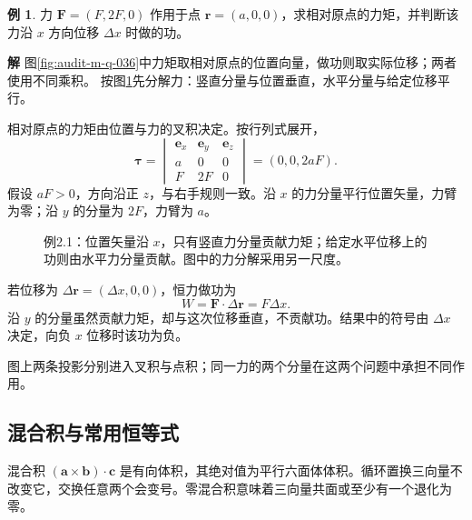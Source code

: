 \documentclass[11pt,openany,fontset=fandol]{ctexbook}
\theoremstyle{plain}\newtheorem{theorem}{定理}[chapter]\newtheorem{proposition}[theorem]{命题}
\theoremstyle{definition}\newtheorem{definition}{定义}[chapter]\newtheorem{example}{例}[chapter]
\theoremstyle{remark}\newtheorem*{remark}{说明}
\newcommand{\SolutionStart}{\par\nobreak\medskip\nobreak\noindent\textbf{解}\quad\ignorespaces}
\newenvironment{solution}{\SolutionStart}{\par\medskip}
\newcommand{\vct}[1]{\bm{#1}}\newcommand{\Rea}{\operatorname{Re}}\newcommand{\Ima}{\operatorname{Im}}
\begin{document}
\begin{example}
力 $\vct F=(F,2F,0)$ 作用于点 $\vct r=(a,0,0)$，求相对原点的力矩，并判断该力沿 $x$ 方向位移 $\Delta x$ 时做的功。
\end{example}

\begin{solution}
图\ref{fig:audit-m-q-036}中力矩取相对原点的位置向量，做功则取实际位移；两者使用不同乘积。
按图\ref{fig:eg-2-1}先分解力：竖直分量与位置垂直，水平分量与给定位移平行。

相对原点的力矩由位置与力的叉积决定。按行列式展开，
\[
\vct\tau=\begin{vmatrix}\vct e_x&\vct e_y&\vct e_z\\a&0&0\\F&2F&0\end{vmatrix}
=(0,0,2aF).
\]
假设 $aF>0$，方向沿正 $z$，与右手规则一致。沿 $x$ 的力分量平行位置矢量，力臂为零；沿 $y$ 的分量为 $2F$，力臂为 $a$。

\begin{figure}[H]\centering
{}
\caption{例2.1：位置矢量沿 $x$，只有竖直力分量贡献力矩；给定水平位移上的功则由水平力分量贡献。图中的力分解采用另一尺度。}\label{fig:eg-2-1}
\end{figure}

若位移为 $\Delta\vct r=(\Delta x,0,0)$，恒力做功为
\[
W=\vct F\cdot\Delta\vct r=F\Delta x.
\]
沿 $y$ 的分量虽然贡献力矩，却与这次位移垂直，不贡献功。结果中的符号由 $\Delta x$ 决定，向负 $x$ 位移时该功为负。

图上两条投影分别进入叉积与点积；同一力的两个分量在这两个问题中承担不同作用。
\end{solution}

\subsection{混合积与常用恒等式}
混合积 $(\vct a\times\vct b)\cdot\vct c$ 是有向体积，其绝对值为平行六面体体积。循环置换三向量不改变它，交换任意两个会变号。零混合积意味着三向量共面或至少有一个退化为零。
\end{document}
